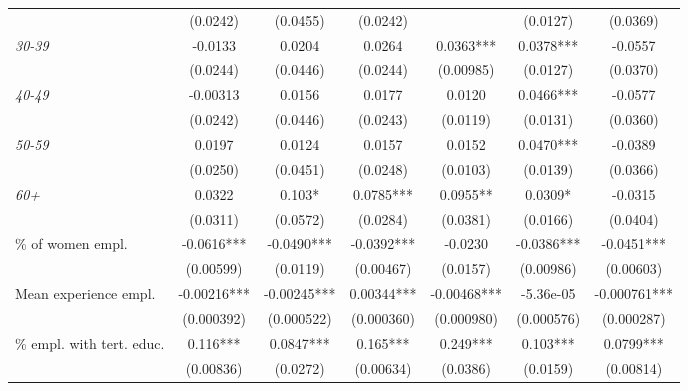 {\begin{threeparttable}
\begin{tabular}{l*{6}{S}}
                                            &       (0.0242)    & (0.0455)    & (0.0242)   &             & (0.0127)   & (0.0369)     \\[1ex]
\quad \textit{30-39}                        &       -0.0133     & 0.0204      & 0.0264     & 0.0363***   & 0.0378***  & -0.0557      \\
                                            &       (0.0244)    & (0.0446)    & (0.0244)   & (0.00985)   & (0.0127)   & (0.0370)     \\[1ex]
\quad \textit{40-49}                        &       -0.00313    & 0.0156      & 0.0177     & 0.0120      & 0.0466***  & -0.0577      \\
                                            &       (0.0242)    & (0.0446)    & (0.0243)   & (0.0119)    & (0.0131)   & (0.0360)     \\[1ex]
\quad \textit{50-59}                        &       0.0197      & 0.0124      & 0.0157     & 0.0152      & 0.0470***  & -0.0389      \\
                                            &       (0.0250)    & (0.0451)    & (0.0248)   & (0.0103)    & (0.0139)   & (0.0366)     \\[1ex]
\quad \textit{60+}                          &       0.0322      & 0.103*      & 0.0785***  & 0.0955**    & 0.0309*    & -0.0315      \\
                                            &       (0.0311)    & (0.0572)    & (0.0284)   & (0.0381)    & (0.0166)   & (0.0404)     \\[1ex]
\% of women empl.                           &       -0.0616***  & -0.0490***  & -0.0392*** & -0.0230     & -0.0386*** & -0.0451***   \\
                                            &       (0.00599)   & (0.0119)    & (0.00467)  & (0.0157)    & (0.00986)  & (0.00603)    \\[1ex]
Mean experience empl.                       &       -0.00216*** & -0.00245*** & 0.00344*** & -0.00468*** & -5.36e-05  & -0.000761*** \\
                                            &       (0.000392)  & (0.000522)  & (0.000360) & (0.000980)  & (0.000576) & (0.000287)   \\[1ex]
\% empl. with tert. educ.                   &       0.116***    & 0.0847***   & 0.165***   & 0.249***    & 0.103***   & 0.0799***    \\
                                            &       (0.00836)   & (0.0272)    & (0.00634)  & (0.0386)    & (0.0159)   & (0.00814)    \\[1ex]

\end{tabular}
\end{threeparttable}}
